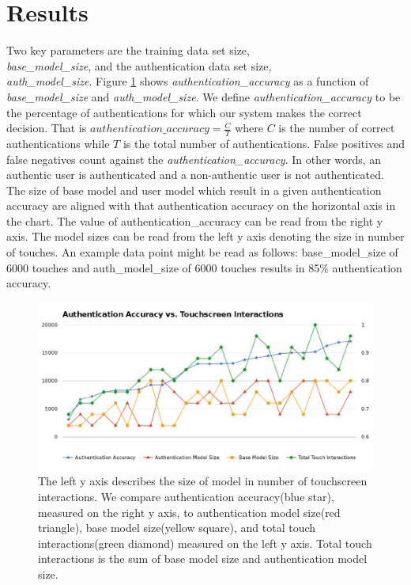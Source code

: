 \documentclass{acm_proc_article-sp}
\begin{document}
\section{Results}
\label{sec:results}

Two key parameters are 
the training data set size,\\
{\it base\_model\_size}, and the 
authentication data set size,\\
{\it auth\_model\_size}.
Figure \ref{fig:authentication_accuracy} shows {\it authentication\_accuracy} 
as a function of {\it base\_model\_size} and {\it auth\_model\_size}.
We define {\it authentication\_accuracy} to be the percentage of authentications for which our system makes the correct decision.
That is $authentication\_accuracy = \frac{C}{T}$ where
$C$ is the number of correct authentications while
$T$ is the total number of authentications.
False positives and false negatives count against the {\it authentication\_accuracy}.
In other words, an authentic user is authenticated and a non-authentic user is not authenticated.
%
The size of base model and user model which result in a given authentication accuracy are aligned with that authentication accuracy on the horizontal axis in the chart.
The value of authentication\_accuracy can be read from the right y axis.
The model sizes can be read from the left y axis 
denoting the size in number of touches.
%
An example data point
might be read as follows: 
base\_model\_size of
6000 touches and auth\_model\_size of 6000 touches
results in 85\% authentication accuracy.

\begin{figure}
\centering
\includegraphics[width=.45\textwidth]{authentication_accuracy_vs_touchscreen_interactions.pdf}
\caption{
The left y axis describes the size of model
in number of touchscreen interactions.
We compare
authentication accuracy(blue star), measured on the right y axis, 
to authentication model size(red triangle),
base model size(yellow square),
and total touch interactions(green diamond)
measured on the left y axis.
Total touch interactions is the sum of
base model size and authentication model size.
}
\label{fig:authentication_accuracy}
\end{figure}
\end{document}
